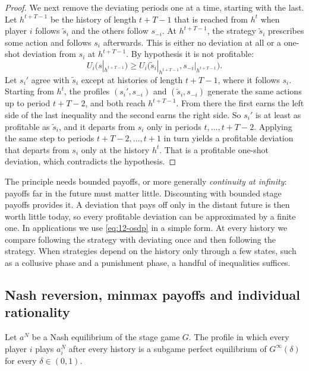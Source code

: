 \begin{proof}
We next remove the deviating periods one at a time, starting with the last. Let $h^{t+T-1}$ be the history of length
$t + T - 1$ that is reached from $h^t$ when player $i$ follows $\tilde s_i$ and the others follow $s_{-i}$. At
$h^{t+T-1}$, the strategy $\tilde s_i$ prescribes some action and follows $s_i$ afterwards. This is either no
deviation at all or a one-shot deviation from $s_i$ at $h^{t+T-1}$. By hypothesis it is not profitable:
\begin{equation*}
U_i\bigl(s|_{h^{t+T-1}}\bigr) \ge U_i\bigl(\tilde s_i|_{h^{t+T-1}}, s_{-i}|_{h^{t+T-1}}\bigr) .
\end{equation*}
Let $s_i'$ agree with $\tilde s_i$ except at histories of length $t + T - 1$, where it follows $s_i$. Starting from
$h^t$, the profiles $(s_i', s_{-i})$ and $(\tilde s_i, s_{-i})$ generate the same actions up to period $t + T - 2$,
and both reach $h^{t+T-1}$. From there the first earns the left side of the last inequality and the second earns the
right side. So $s_i'$ is at least as profitable as $\tilde s_i$, and it departs from $s_i$ only in periods
$t, \dots, t + T - 2$. Applying the same step to periods $t + T - 2, \dots, t + 1$ in turn yields a profitable
deviation that departs from $s_i$ only at the history $h^t$. That is a profitable one-shot deviation, which
contradicts the hypothesis.
\end{proof}

The principle needs bounded payoffs, or more generally \emph{continuity at infinity}: payoffs far in the future must
matter little. Discounting with bounded stage payoffs provides it. A deviation that pays off only in the distant
future is then worth little today, so every profitable deviation can be approximated by a finite one. In applications
we use \eqref{eq:12-osdp} in a simple form. At every history we compare following the strategy with deviating once
and then following the strategy. When strategies depend on the history only through a few states, such as a
collusive phase and a punishment phase, a handful of inequalities suffices.

\subsection{Nash reversion, minmax payoffs and individual rationality}\label{sec:12-minmax}

\begin{proposition}\label{prop:12-static-repeat}
Let $a^N$ be a Nash equilibrium of the stage game $G$. The profile in which every player $i$ plays $a_i^N$ after every
history is a subgame perfect equilibrium of $G^\infty(\delta)$ for every $\delta \in (0, 1)$.
\end{proposition}

